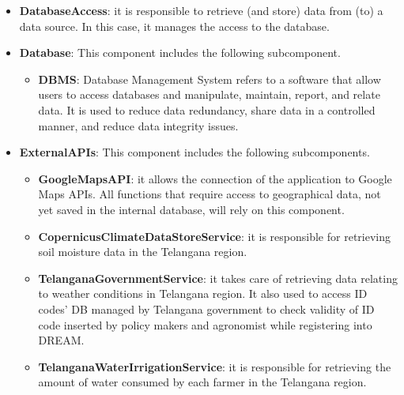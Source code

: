 \begin{itemize}
\item \textbf{DatabaseAccess}: it is responsible to retrieve (and store) data from (to) a data source. In this case, it manages the access to the database.

\item \textbf{Database}: This component includes the following subcomponent.

\begin{itemize}
    \item \textbf{DBMS}: Database Management System refers to a software that allow users to access databases and manipulate, maintain, report, and relate data. It is used to reduce data redundancy, share data in a controlled manner, and reduce data integrity issues.
\end{itemize}

\item \textbf{ExternalAPIs}: This component includes the following subcomponents.

\begin{itemize}
    \item \textbf{GoogleMapsAPI}: it allows the connection of the application to Google Maps APIs. All functions that require access to geographical data, not yet saved in the internal database, will rely on this component.
    \item \textbf{CopernicusClimateDataStoreService}: it is responsible for retrieving soil moisture data in the Telangana region.
    \item \textbf{TelanganaGovernmentService}: it takes care of retrieving data relating to weather conditions in Telangana region. It also used to access ID codes' DB managed by Telangana government to check validity of ID code inserted by policy makers and agronomist while registering into DREAM. 
    \item \textbf{TelanganaWaterIrrigationService}: it is responsible for retrieving the amount of water consumed by each farmer in the Telangana region.
\end{itemize}

\end{itemize}


\def\fillandplacepagenumber{%
 \par\pagestyle{empty}%
\vbox to 0pt{\vss}\vfill
\vbox to 0pt{\baselineskip0pt
   \hbox to\linewidth{\hss}%
   \setlength{\footskip}{70pt}
   \baselineskip\footskip
   \hbox to\linewidth{%
     \hfil\thepage\hfil}\vss}}


